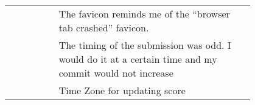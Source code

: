 {\begin{longtable}{R|p{0.8\linewidth}}
		& The favicon reminds me of the ``browser tab crashed'' favicon.                                                                                                                                                                                                                                                                                                                                                                                                                                                                                                                                                                                                                                                                                     \\
		& The timing of the submission was odd. I would do it at a certain time and my commit would not increase                                                                                                                                                                                                                                                                                                                                                                                                                                                                                                                                                                                                                                           \\
		& Time Zone for updating score        
\end{longtable}
}